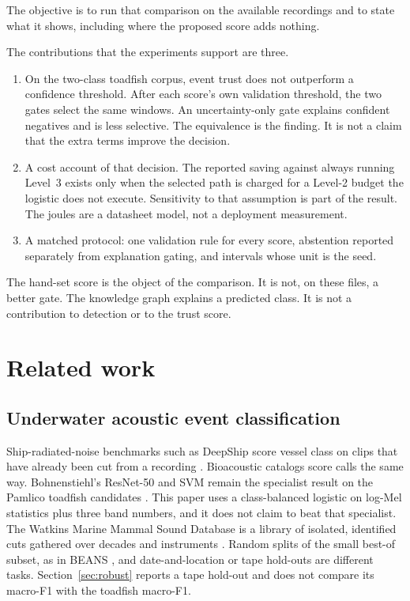 \documentclass[sn-mathphys-num]{sn-jnl}%
\theoremstyle{thmstyleone}%
\theoremstyle{thmstyletwo}%
\theoremstyle{thmstylethree}%
\begin{document}
The objective is to run that comparison on the available recordings and to state what it shows, including where the proposed score adds nothing.

The contributions that the experiments support are three.
\begin{enumerate}[leftmargin=1.5em]
\item On the two-class toadfish corpus, event trust does not outperform a confidence threshold. After each score's own validation threshold, the two gates select the same windows. An uncertainty-only gate explains confident negatives and is less selective. The equivalence is the finding. It is not a claim that the extra terms improve the decision.
\item A cost account of that decision. The reported saving against always running Level~3 exists only when the selected path is charged for a Level-2 budget the logistic does not execute. Sensitivity to that assumption is part of the result. The joules are a datasheet model, not a deployment measurement.
\item A matched protocol: one validation rule for every score, abstention reported separately from explanation gating, and intervals whose unit is the seed.
\end{enumerate}
The hand-set score is the object of the comparison. It is not, on these files, a better gate. The knowledge graph explains a predicted class. It is not a contribution to detection or to the trust score.

\section{Related work}\label{sec:related}

\subsection{Underwater acoustic event classification}\label{sec:rw-class}

Ship-radiated-noise benchmarks such as DeepShip score vessel class on clips that have already been cut from a recording \cite{irfan2021}. Bioacoustic catalogs score calls the same way. Bohnenstiehl's ResNet-50 and SVM remain the specialist result on the Pamlico toadfish candidates \cite{bohnenstiehl2023}. This paper uses a class-balanced logistic on log-Mel statistics plus three band numbers, and it does not claim to beat that specialist. The Watkins Marine Mammal Sound Database is a library of isolated, identified cuts gathered over decades and instruments \cite{sayigh2016}. Random splits of the small best-of subset, as in BEANS \cite{hagiwara2022}, and date-and-location or tape hold-outs \cite{aguiar2021} are different tasks. Section~\ref{sec:robust} reports a tape hold-out and does not compare its macro-F1 with the toadfish macro-F1.
\end{document}
